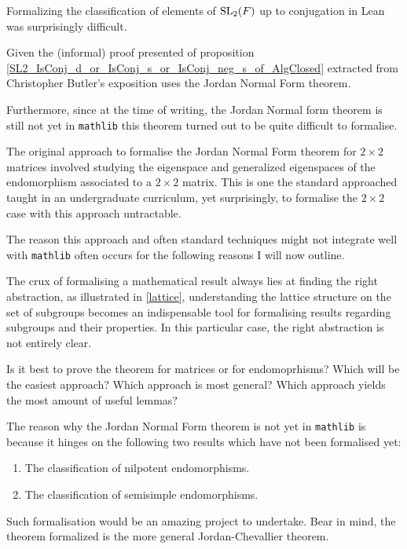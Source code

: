 \begin{remark}
Formalizing the classification of elements of $\operatorname{SL}_2(F)$ up to conjugation in Lean was surprisingly difficult.

Given the (informal) proof presented of proposition \ref{SL2_IsConj_d_or_IsConj_s_or_IsConj_neg_s_of_AlgClosed} extracted from Christopher Butler's exposition uses the Jordan Normal Form theorem. 

Furthermore, since at the time of writing, the Jordan Normal form theorem is still not yet in \texttt{mathlib} this theorem turned out to be quite difficult to formalise.

The original approach to formalise the Jordan Normal Form theorem for $2 \times 2$ matrices involved studying the eigenspace and generalized eigenspaces of the endomorphism associated to a $2 \times 2$ matrix.
This is one the standard approached taught in an undergraduate curriculum, yet surprisingly, to formalise the $2 \times 2$ case with this approach untractable.

The reason this approach and often standard techniques might not integrate well with \texttt{mathlib} often occurs for the following reasons I will now outline.

The crux of formalising a mathematical result always lies at finding the right abstraction, as illustrated in \ref{lattice}, understanding the lattice structure on the set of subgroups becomes an indispensable tool for formalising
results regarding subgroups and their properties. In this particular case, the right abstraction is not entirely clear.

Is it best to prove the theorem for matrices or for endomoprhisms? Which will be the easiest approach? Which approach is most general? Which approach yields the most amount of useful lemmas?

The reason why the Jordan Normal Form theorem is not yet in \texttt{mathlib} is because it hinges on the following two results which have not been formalised yet:

\begin{enumerate}
    \item The classification of nilpotent endomorphisms.
    \item The classification of semisimple endomorphisms.
\end{enumerate}

Such formalisation would be an amazing project to undertake. Bear in mind, the theorem formalized is the more general Jordan-Chevallier theorem.


\end{remark}
